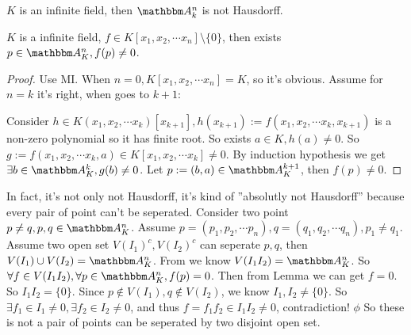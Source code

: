 \documentclass{ctexart}
\begin{document}
\begin{problem}
$K$ is an infinite field, then $\A_k^n$ is not Hausdorff.
\end{problem}
\begin{solution}
	\begin{lemma}
		\label{lem:2}
		$K$ is a infinite field, $f\in K[x_1,x_2,\cdots x_n]\setminus \{0\}$, then exists $p\in \A_K^n,f(p)\neq 0$.
	\end{lemma}
	\begin{proof}
		Use MI. When $n=0,K[x_1,x_2,\cdots x_n]=K$, so it's obvious. Assume for $n=k$ it's right, when goes to $k+1$:

		Consider $h\in K(x_1,x_2,\cdots x_k)[x_{k+1}],h(x_{k+1}):=f(x_1,x_2,\cdots x_k,x_{k+1})$ is a non-zero polynomial so it has finite root. So exists $a\in K,h(a)\neq 0$. So $g:=f(x_1,x_2,\cdots x_k,a)\in K[x_1,x_2,\cdots x_k]\neq 0$.
		By induction hypothesis we get $\exists b\in \A_K^k,g(b)\neq 0$. Let $p:=(b,a)\in \A_K^{k+1}$, then $f(p)\neq 0$.
	\end{proof}
	In fact, it's not only not Hausdorff, it's kind of ''absolutly not Hausdorff'' because every pair of point can't be seperated.
	Consider two point $p\neq q,p,q\in \A_K^n$.
	Assume $p=(p_1,p_2,\cdots p_n),q=(q_1,q_2,\cdots q_n),p_1\neq q_1$. Assume two open set $V(I_1)^c,V(I_2)^c$ can seperate $p,q$, then $V(I_1)\cup V(I_2)=\A_K^n$.
	From  we know $V(I_1I_2)=\A_K^n$. So $\forall f\in V(I_1I_2),\forall p\in \A_K^n,f(p)=0$.
	Then from Lemma we can get $f=0$. So $I_1I_2=\{0\}$.
	Since $p\notin V(I_1),q\notin V(I_2)$, we know $I_1,I_2\neq \{0\}$. So $\exists f_1\in I_1\neq 0,\exists f_2\in I_2\neq 0$, and thus $f=f_1f_2\in I_1I_2\neq 0$, contradiction!
	\(\phi\)
	So these is not a pair of points can be seperated by two disjoint open set.
\end{solution}
\end{document}
